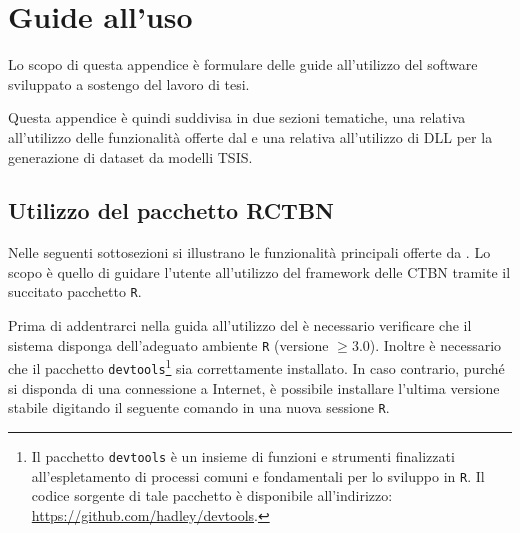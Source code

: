 
\chapter{Guide all'uso}
\label{cap:guide}
Lo scopo di questa appendice è formulare delle guide all'utilizzo del software sviluppato a sostengo del lavoro di tesi.

Questa appendice è quindi suddivisa in due sezioni tematiche, una relativa all'utilizzo delle funzionalità offerte dal \pacchettor{} e una relativa all'utilizzo di  \acs{DLL} per la generazione di dataset da modelli \acs{TSIS}.

\section{Utilizzo del pacchetto RCTBN}\label{sec:package-howto}
Nelle seguenti sottosezioni si illustrano le funzionalità principali offerte da \rctbn{}. Lo scopo è quello di guidare l'utente all'utilizzo del framework delle \acs{CTBN} tramite il succitato pacchetto \lstinline[]|R|.

Prima di addentrarci nella guida all'utilizzo del \pacchettor{} è necessario verificare che il sistema disponga dell'adeguato ambiente \lstinline[]|R| (versione $\ge 3.0$). Inoltre è necessario che il pacchetto \lstinline[]|devtools|\footnote{Il pacchetto \lstinline[]|devtools| è un insieme di funzioni e strumenti finalizzati all'espletamento di processi comuni e fondamentali per lo sviluppo in \lstinline[]|R|. Il codice sorgente di tale pacchetto è disponibile all'indirizzo: \url{https://github.com/hadley/devtools}.} sia correttamente installato. In caso contrario, purché si disponda di una connessione a Internet, è possibile installare l'ultima versione stabile digitando il seguente comando in una nuova sessione \lstinline[]|R|.

\vspace*{8pt}


